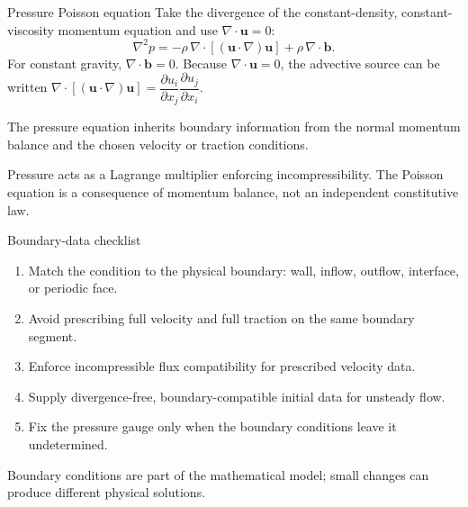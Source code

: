 \documentclass[aspectratio=169,11pt]{beamer}
\newcommand{\uvec}{\bm{u}}
\newcommand{\bvec}{\bm{b}}
\begin{document}
\begin{frame}{Pressure Poisson equation}
Take the divergence of the constant-density, constant-viscosity momentum equation and use $\nabla\cdot\uvec=0$:
\[
  \boxed{
  \nabla^2p
  =-\rho\,\nabla\cdot\left[(\uvec\cdot\nabla)\uvec\right]
  +\rho\,\nabla\cdot\bvec
  }.
\]
For constant gravity, $\nabla\cdot\bvec=0$. Because $\nabla\cdot\uvec=0$, the advective source can be written
$\nabla\cdot[(\uvec\cdot\nabla)\uvec]=\dfrac{\partial u_i}{\partial x_j}\dfrac{\partial u_j}{\partial x_i}$.

The pressure equation inherits boundary information from the normal momentum balance and the chosen velocity or traction conditions.

\begin{punchbox}
\small Pressure acts as a Lagrange multiplier enforcing incompressibility. The Poisson equation is a consequence of momentum balance, not an independent constitutive law.
\end{punchbox}
\end{frame}

\begin{frame}{Boundary-data checklist}
\begin{enumerate}\itemsep7pt
  \item Match the condition to the physical boundary: wall, inflow, outflow, interface, or periodic face.
  \item Avoid prescribing full velocity and full traction on the same boundary segment.
  \item Enforce incompressible flux compatibility for prescribed velocity data.
  \item Supply divergence-free, boundary-compatible initial data for unsteady flow.
  \item Fix the pressure gauge only when the boundary conditions leave it undetermined.
\end{enumerate}
\begin{punchbox}
\centering
\small Boundary conditions are part of the mathematical model; small changes can produce different physical solutions.
\end{punchbox}
\end{frame}
\end{document}
